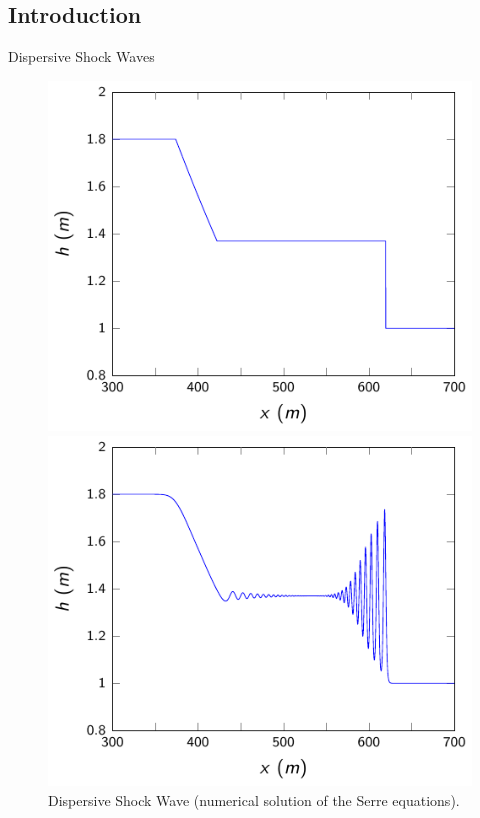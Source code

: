 \documentclass[pdf]{beamer}
\begin{document}
\subsection{Introduction}
\begin{frame}{Dispersive Shock Waves}
		
   \begin{figure}
    	\centering
    	\begin{minipage}{.5\textwidth}
    		\centering
    		\includegraphics[width=0.9\linewidth]{./Pictures/DSW/SW.pdf}
    		\caption{Shock Wave (analytical solution of the shallow water wave equations).}
    	\end{minipage}%
    	\begin{minipage}{.5\textwidth}
    		\centering
    		\includegraphics[width=0.9\linewidth]{./Pictures/DSW/DSW.pdf}
    		\caption{Dispersive Shock Wave (numerical solution of the Serre equations).}
    	\end{minipage}
   \end{figure}
\end{frame}
\end{document}

